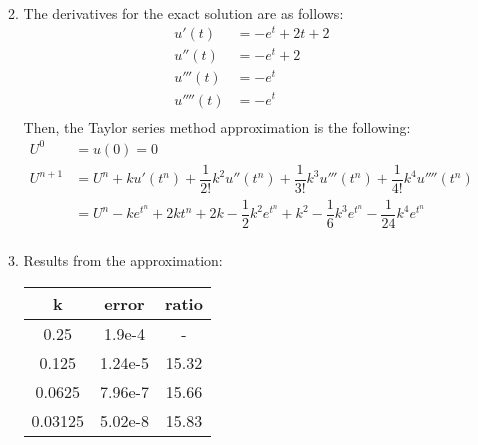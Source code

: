 \documentclass{article}
\begin{document}
\begin{enumerate}
\begin{enumerate}
\begin{equation*}
\begin{split}
                    \end{split}
                \end{equation*}
            \item
                The derivatives for the exact solution are as follows: \\
                \begin{equation*}
                    \begin{split}
                        u'(t)    & = -e^t + 2t + 2 \\
                        u''(t)   & = -e^t + 2 \\
                        u'''(t)  & = -e^t \\
                        u''''(t) & = -e^t \\
                    \end{split}
                \end{equation*}
                Then, the Taylor series method approximation is the following: \\
                \begin{equation*}
                    \begin{split}
                        U^0     & = u(0) = 0 \\
                        U^{n+1} & = U^n + ku'(t^n) + \dfrac{1}{2!}k^2u''(t^n) + \dfrac{1}{3!}k^3u'''(t^n) + \dfrac{1}{4!}k^4u''''(t^n) \\
                                & = U^n -ke^{t^n} + 2kt^n + 2k - \dfrac{1}{2}k^2e^{t^n} + k^2 - \dfrac{1}{6}k^3e^{t^n} - \dfrac{1}{24}k^4e^{t^n} \\
                    \end{split}
                \end{equation*}
            \item
                Results from the approximation: \\
                \begin{center}
                    \begin{tabular}{| c | c | c |}
                        \hline
                        k & error & ratio \\
                        \hline
                        0.25 & 1.9e-4 & - \\
                        0.125 & 1.24e-5 & 15.32 \\
                        0.0625 & 7.96e-7 & 15.66 \\
                        0.03125 & 5.02e-8 & 15.83 \\

\end{tabular}
\end{center}
\end{enumerate}
\end{enumerate}
\end{document}
